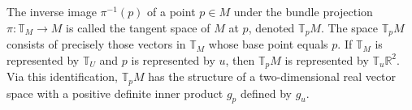 The inverse image $\pi^{-1}(p)$ of a point $p \in M$ under the bundle projection $\pi: \mathbb{T}_M \rightarrow M$ is called the tangent space of $M$ at $p$, denoted $\mathbb{T}_p M$. The space $\mathbb{T}_p M$ consists of precisely those vectors in $\mathbb{T}_M$ whose base point equals $p$. If $\mathbb{T}_M$ is represented by $\mathbb{T}_U$ and $p$ is represented by $u$, then $\mathbb{T}_p M$ is represented by $\mathbb{T}_u \mathbb{R}^2$. Via this identification, $\mathbb{T}_p M$ has the structure of a two-dimensional real vector space with a positive definite inner product $g_p$ defined by $g_u$.
